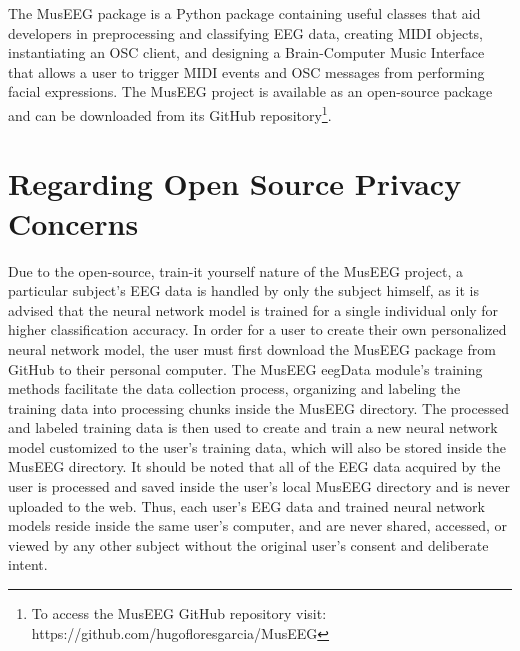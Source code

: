 The MusEEG package is a Python package containing useful classes that aid developers in preprocessing and classifying EEG data, creating MIDI objects, instantiating an OSC client, and designing a Brain-Computer Music Interface that allows a user to trigger MIDI events and OSC messages from performing facial expressions. The MusEEG project is available as an open-source package and can be downloaded from its GitHub repository\footnote{To access the MusEEG GitHub repository visit: https://github.com/hugofloresgarcia/MusEEG}.

\section{Regarding Open Source Privacy Concerns}
Due to the open-source, train-it yourself nature of the MusEEG project, a particular subject’s EEG data is handled by only the subject himself, as it is advised that the neural network model is trained for a single individual only for higher classification accuracy. 
In order for a user to create their own personalized neural network model, the user must first download the MusEEG package from GitHub to their personal computer. The MusEEG eegData module’s training methods facilitate the data collection process, organizing and labeling the training data into processing chunks inside the MusEEG directory. The processed and labeled training data is then used to create and train a new neural network model customized to the user’s training data, which will also be stored inside the MusEEG directory. 
It should be noted that all of the EEG data acquired by the user is processed and saved inside the user’s local MusEEG directory and is never uploaded to the web. Thus, each user’s EEG data and trained neural network models reside inside the same user’s computer, and are never shared, accessed, or viewed by any other subject without the original user’s consent and deliberate intent.


